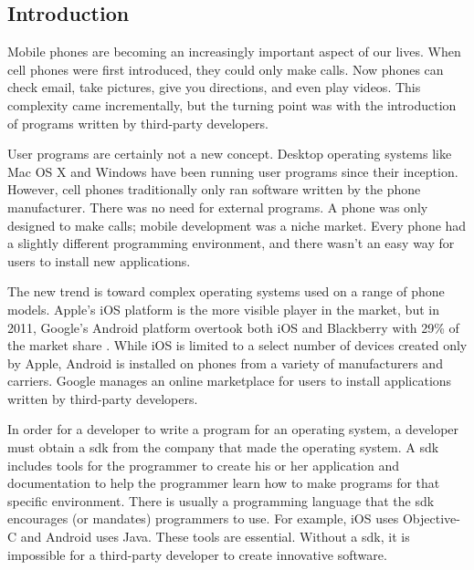 \documentclass[11pt]{article}
\begin{document}
\begin{multicols}{2}
\setcounter{page}{1}

\section{Introduction} %
\label{sec:intro}

Mobile phones are becoming an increasingly important aspect of our lives.  When
cell phones were first introduced, they could only make calls.  Now phones can
check email, take pictures, give you directions, and even play videos.  This
complexity came incrementally, but the turning point was with the introduction
of programs written by third-party developers.

User programs are certainly not a new concept.  Desktop operating systems like
Mac OS X and Windows have been running user programs since their inception.
However, cell phones traditionally only ran software written by the phone
manufacturer.  There was no need for external programs.  A phone was only
designed to make calls; mobile development was a niche market.  Every phone had
a slightly different programming environment, and there wasn't an easy way for
users to install new applications.

The new trend is toward complex operating systems used on a range of phone
models.  Apple's iOS platform is the more visible player in the market, but in
2011, Google's Android platform overtook both iOS and Blackberry with 29\% of
the market share \cite{android-market-share}.  While iOS is limited to a select
number of devices created only by Apple, Android is installed on phones from a
variety of manufacturers and carriers.  Google manages an online marketplace for
users to install applications written by third-party developers.

In order for a developer to write a program for an operating system, a developer
must obtain a \gls{sdk} from the company that made the operating system.  A
\gls{sdk} includes tools for the programmer to create his or her application and
documentation to help the programmer learn how to make programs for that
specific environment.  There is usually a programming language that the
\gls{sdk} encourages (or mandates) programmers to use.  For example, iOS uses
Objective-C and Android uses Java.  These tools are essential.  Without a
\gls{sdk}, it is impossible for a third-party developer to create innovative
software.


\end{multicols}
\end{document}
